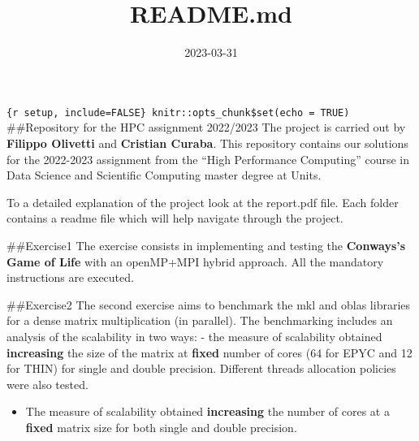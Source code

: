 \documentclass[
]{article}
\title{README.md}
\author{}
\date{\vspace{-2.5em}2023-03-31}
\providecommand{\tightlist}{%
  \setlength{\itemsep}{0pt}\setlength{\parskip}{0pt}}
\begin{document}
\maketitle

\texttt{\{r\ setup,\ include=FALSE\}\ knitr::opts\_chunk\$set(echo\ =\ TRUE)}
\#\#Repository for the HPC assignment 2022/2023 The project is carried
out by \textbf{Filippo Olivetti} and \textbf{Cristian Curaba}. This
repository contains our solutions for the 2022-2023 assignment from the
``High Performance Computing'' course in Data Science and Scientific
Computing master degree at Units.

To a detailed explanation of the project look at the report.pdf file.
Each folder contains a readme file which will help navigate through the
project.

\#\#Exercise1 The exercise consists in implementing and testing the
\textbf{Conways's Game of Life} with an openMP+MPI hybrid approach. All
the mandatory instructions are executed.

\#\#Exercise2 The second exercise aims to benchmark the mkl and oblas
libraries for a dense matrix multiplication (in parallel). The
benchmarking includes an analysis of the scalability in two ways: - the
measure of scalability obtained \textbf{increasing} the size of the
matrix at \textbf{fixed} number of cores (64 for EPYC and 12 for THIN)
for single and double precision. Different threads allocation policies
were also tested.

\begin{itemize}
\tightlist
\item
  The measure of scalability obtained \textbf{increasing} the number of
  cores at a \textbf{fixed} matrix size for both single and double
  precision.
\end{itemize}
\end{document}
